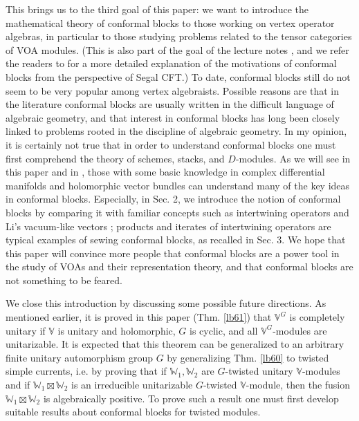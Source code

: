 \documentclass[11pt,b5paper,notitlepage]{article}
\theoremstyle{definition}
\theoremstyle{plain}
\newcommand{\Vbb}{\mathbb V}
\newcommand{\Wbb}{\mathbb W}
\numberwithin{equation}{section}
\begin{document}
This brings us to the third goal of this paper: we want to introduce the mathematical theory of conformal blocks to those working on vertex operator algebras, in particular to those studying problems related to the tensor categories of VOA modules. (This is also part of the goal of the lecture notes \cite{Gui23b}, and we refer the readers to \cite{Gui23b} for a more detailed explanation of the motivations of conformal blocks from the perspective of Segal CFT.) To date, conformal blocks still do not seem to be very popular among vertex algebraists. Possible reasons are that in the literature conformal blocks are usually written in the difficult language of algebraic geometry, and that interest in conformal blocks has long been closely linked to problems rooted in the discipline of algebraic geometry. In my opinion, it is certainly not true that in order to understand conformal blocks one must first comprehend the theory of schemes, stacks, and $D$-modules. As we will see in this paper and in \cite{Gui23b}, those with some basic knowledge in complex differential manifolds and holomorphic vector bundles can understand many of the key ideas in conformal blocks. Especially, in Sec. 2, we introduce the notion of conformal blocks by comparing it with familiar concepts such as intertwining operators and Li's vacuum-like vectors \cite{Li94}; products and iterates of intertwining operators are typical examples of sewing conformal blocks, as recalled in Sec. 3. We hope that this paper will convince more people that conformal blocks are a power tool in the study of VOAs and their representation theory, and that conformal blocks are not something to be feared.

We close this introduction by discussing some possible future directions. As mentioned earlier, it is proved in this paper (Thm. \ref{lb61}) that $\Vbb^G$ is completely unitary if $\Vbb$ is unitary and holomorphic, $G$ is cyclic, and all $\Vbb^G$-modules are unitarizable. It is expected that this theorem can be generalized to an arbitrary finite unitary automorphism group $G$ by generalizing Thm. \ref{lb60} to twisted simple currents, i.e. by proving that if $\Wbb_1,\Wbb_2$ are $G$-twisted unitary $\Vbb$-modules and if $\Wbb_1\boxtimes\Wbb_2$ is an irreducible unitarizable $G$-twisted $\Vbb$-module, then the fusion $\Wbb_1\boxtimes\Wbb_2$ is algebraically positive. To prove such a result one must first develop suitable results about conformal blocks for twisted modules.
\end{document}
